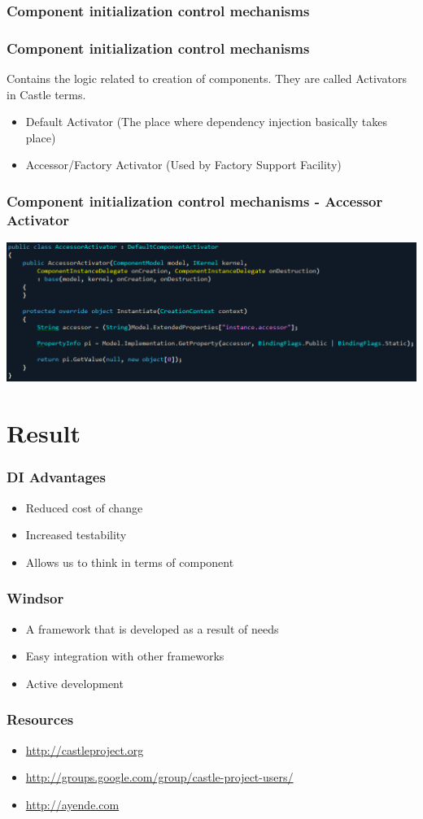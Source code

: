 \documentclass[turkish,handout]{beamer}
\begin{document}
			\subsubsection{Component initialization control mechanisms}
			  \frame
				{
					\frametitle{Component initialization control mechanisms}
					Contains the logic related to creation of components. They are called Activators in Castle terms.
			  	\begin{itemize}
			  		\item<1->Default Activator (The place where dependency injection basically takes place)
			  		\item<2->Accessor/Factory Activator (Used by Factory Support Facility)
			  	\end{itemize}
			 }
			 	\frame
				{
					\frametitle{Component initialization control mechanisms - Accessor Activator}
					\begin{center}
							\includegraphics[scale=0.40]{images/accessoractivator.png}
					\end{center}
			  }
	\section{Result}
		 \frame
		 {
		  	\frametitle{DI Advantages}
				\begin{itemize}
					\item<1->Reduced cost of change
			  	\item<2->Increased testability
			  	\item<3->Allows us to think in terms of component
			  \end{itemize}
			}
			\frame
		 {
		  	\frametitle{Windsor}
				\begin{itemize}
					\item<1->A framework that is developed as a result of needs
			  	\item<2->Easy integration with other frameworks
			  	\item<3->Active development
			  \end{itemize}
			}
			\frame
		 {
		  	\frametitle{Resources}
				\begin{itemize}
					\item<1->\href{http://castleproject.org}{http://castleproject.org}
					\item<2->\href{http://groups.google.com/group/castle-project-users/}{http://groups.google.com/group/castle-project-users/}
			  	\item<3->\href{http://ayende.com}{http://ayende.com}
			  \end{itemize}
			}
\end{document}
